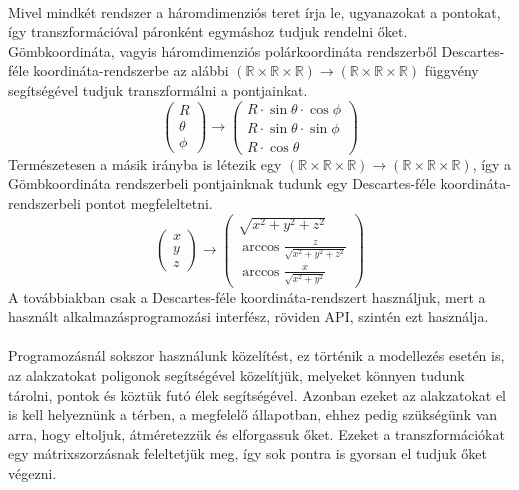 \documentclass{elteikthesis}
\begin{document}
\paragraph{}
Mivel mindkét rendszer a háromdimenziós teret írja le, ugyanazokat a pontokat, így transzformációval páronként egymáshoz tudjuk rendelni őket.
Gömbkoordináta, vagyis háromdimenziós polárkoordináta rendszerből Descartes-féle koordináta-rendszerbe az alábbi $(\mathbb{R} \times \mathbb{R} \times \mathbb{R}) \rightarrow (\mathbb{R} \times \mathbb{R} \times \mathbb{R})$ függvény segítségével tudjuk transzformálni a pontjainkat.
$$
\left( \begin{array}{c}
	R \\
	\theta \\
	\phi \end{array}
\right)
\rightarrow
\left( \begin{array}{c}
	R \cdot \sin \theta \cdot \cos \phi \\
	R \cdot \sin \theta \cdot \sin \phi \\
	R \cdot \cos \theta
\end{array} \right)
$$
Természetesen a másik irányba is létezik egy $(\mathbb{R} \times \mathbb{R} \times \mathbb{R}) \rightarrow (\mathbb{R} \times \mathbb{R} \times \mathbb{R})$, így a Gömbkoordináta rendszerbeli pontjainknak tudunk egy Descartes-féle koordináta-rendszerbeli pontot megfeleltetni.
$$
\left( \begin{array}{c}
	x \\
	y \\
	z \end{array}
\right)
\rightarrow
\left( \begin{array}{c}
	\sqrt{x^2+y^2+z^2} \\
	\arccos{\frac{z}{\sqrt{x^2+y^2+z^2}}} \\
	\arccos{\frac{x}{\sqrt{x^2+y^2}}}
\end{array} \right)
$$
A továbbiakban csak a Descartes-féle koordináta-rendszert használjuk, mert a használt alkalmazásprogramozási interfész, röviden API, szintén ezt használja.
\paragraph{}
Programozásnál sokszor használunk közelítést, ez történik a modellezés esetén is, az alakzatokat poligonok segítségével közelítjük, melyeket könnyen tudunk tárolni, pontok és köztük futó élek segítségével. Azonban ezeket az alakzatokat el is kell helyeznünk a térben, a megfelelő állapotban, ehhez pedig szükségünk van arra, hogy eltoljuk, átméretezzük és elforgassuk őket. Ezeket a transzformációkat egy mátrixszorzásnak feleltetjük meg, így sok pontra is gyorsan el tudjuk őket végezni.
\end{document}
